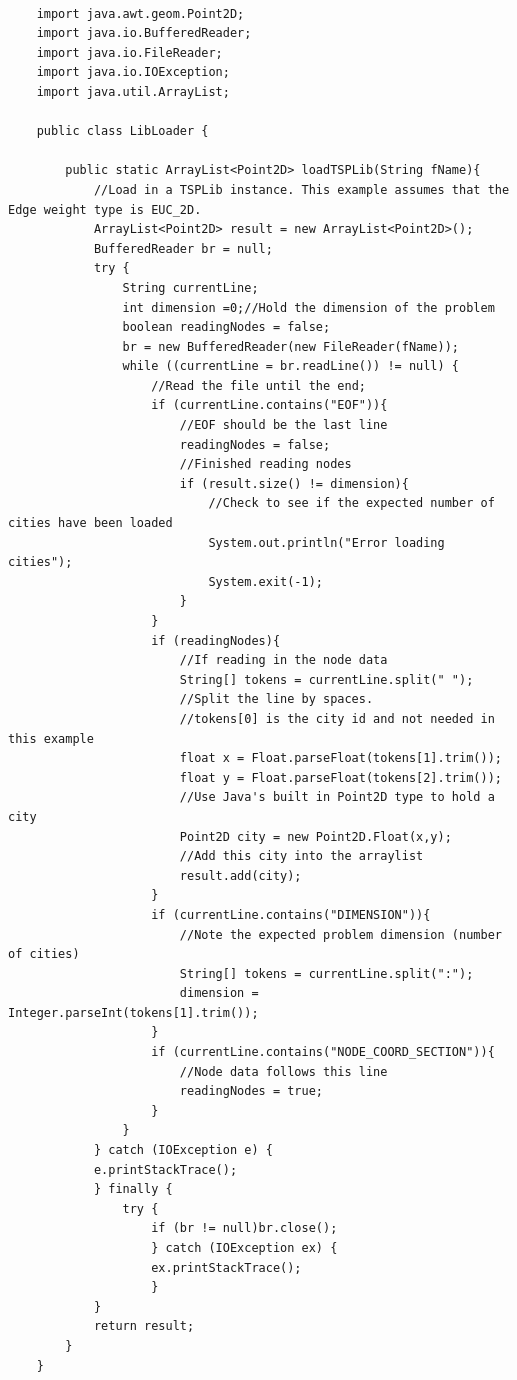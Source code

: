\documentclass[conference,backref=page]{acmsiggraph}
\begin{document}
\begin{lstlisting}

	import java.awt.geom.Point2D;
	import java.io.BufferedReader;
	import java.io.FileReader;
	import java.io.IOException;
	import java.util.ArrayList;
	
	public class LibLoader {
		
		public static ArrayList<Point2D> loadTSPLib(String fName){
			//Load in a TSPLib instance. This example assumes that the Edge weight type is EUC_2D.
			ArrayList<Point2D> result = new ArrayList<Point2D>();
			BufferedReader br = null;
			try {
				String currentLine;
				int dimension =0;//Hold the dimension of the problem
				boolean readingNodes = false;
				br = new BufferedReader(new FileReader(fName));
				while ((currentLine = br.readLine()) != null) {
					//Read the file until the end;
					if (currentLine.contains("EOF")){
						//EOF should be the last line
						readingNodes = false;
						//Finished reading nodes
						if (result.size() != dimension){
							//Check to see if the expected number of cities have been loaded
							System.out.println("Error loading cities");
							System.exit(-1);
						}
					}
					if (readingNodes){
						//If reading in the node data
						String[] tokens = currentLine.split(" ");
						//Split the line by spaces.
						//tokens[0] is the city id and not needed in this example
						float x = Float.parseFloat(tokens[1].trim());
						float y = Float.parseFloat(tokens[2].trim());
						//Use Java's built in Point2D type to hold a city
						Point2D city = new Point2D.Float(x,y);
						//Add this city into the arraylist
						result.add(city);
					}
					if (currentLine.contains("DIMENSION")){
						//Note the expected problem dimension (number of cities)
						String[] tokens = currentLine.split(":");
						dimension = Integer.parseInt(tokens[1].trim());
					}
					if (currentLine.contains("NODE_COORD_SECTION")){
						//Node data follows this line
						readingNodes = true;
					}
				}
			} catch (IOException e) {
			e.printStackTrace();
			} finally {
				try {
					if (br != null)br.close();
					} catch (IOException ex) {
					ex.printStackTrace();
					}
			}
			return result;
		}
	}
\end{lstlisting}
\end{document}
